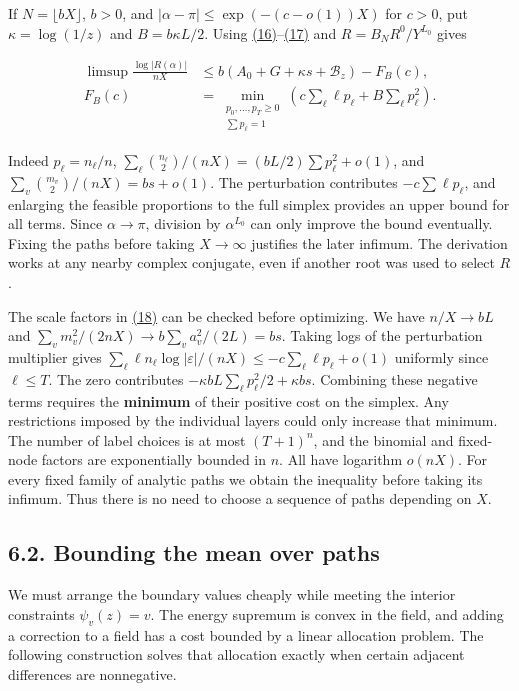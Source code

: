 \documentclass[11pt,a4paper]{article}
\begin{document}
If \(N=\lfloor bX\rfloor\), \(b>0\), and \(|\alpha-\pi|\le \exp(-(c-o(1))X)\) for \(c>0\), put \(\kappa=\log(1/z)\) and \(B=b\kappa L/2\). Using \hyperref[eq:16]{(16)}--\hyperref[eq:17]{(17)} and \(R=B_NR^0/Y^{L_0}\) gives

\[
 \begin{aligned}
 \limsup\frac{\log|R(\alpha)|}{nX}
 &\le b(A_0+G+\kappa s+\mathcal B_z)-F_B(c),\\
 F_B(c)&=\min_{\substack{p_0,\ldots,p_T\ge0\\ \sum p_\ell=1}}
        \left(c\sum_\ell \ell p_\ell+B\sum_\ell p_\ell^2\right).
 \end{aligned}                                                            \tag{18}\label{eq:18}
\]

Indeed \(p_\ell=n_\ell/n\), \(\sum_\ell\binom{n_\ell}{2}/(nX)=(bL/2)\sum p_\ell^2+o(1)\), and \(\sum_v\binom{m_v}{2}/(nX)=bs+o(1)\). The perturbation contributes \(-c\sum\ell p_\ell\), and enlarging the feasible proportions to the full simplex provides an upper bound for all terms. Since \(\alpha\to\pi\), division by \(\alpha^{L_0}\) can only improve the bound eventually. Fixing the paths before taking \(X\to\infty\) justifies the later infimum. The derivation works at any nearby complex conjugate, even if another root was used to select \(R\).

The scale factors in \hyperref[eq:18]{(18)} can be checked before optimizing. We have \(n/X\to bL\) and \(\sum_v m_v^2/(2nX)\to b\sum_v a_v^2/(2L)=bs\). Taking logs of the perturbation multiplier gives \(\sum_\ell\ell n_\ell\log|\varepsilon|/(nX)\le-c\sum_\ell\ell p_\ell+o(1)\) uniformly since \(\ell\le T\). The zero contributes \(-\kappa bL\sum_\ell p_\ell^2/2+\kappa bs\). Combining these negative terms requires the \textbf{minimum} of their positive cost on the simplex. Any restrictions imposed by the individual layers could only increase that minimum. The number of label choices is at most \((T+1)^n\), and the binomial and fixed-node factors are exponentially bounded in \(n\). All have logarithm \(o(nX)\). For every fixed family of analytic paths we obtain the inequality before taking its infimum. Thus there is no need to choose a sequence of paths depending on \(X\).

\subsection{6.2. Bounding the mean over paths}\label{bounding-the-mean-over-paths}

We must arrange the boundary values cheaply while meeting the interior constraints \(\psi_v(z)=v\). The energy supremum is convex in the field, and adding a correction to a field has a cost bounded by a linear allocation problem. The following construction solves that allocation exactly when certain adjacent differences are nonnegative.
\end{document}
